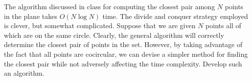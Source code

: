 The algorithm discussed in class for computing the closest pair among
$N$ points in the plane takes $O(N \log  N)$ time.  The divide and
conquer strategy employed is clever, but somewhat complicated.  Suppose
that we are given $N$ points all of which are on the same circle.
Clearly, the general algorithm will correctly determine the closest
pair of points in the set.  However, by taking advantage of the fact
that all points are cocircular, we can devise a simpler method for
finding the closest pair while not adversely affecting the time
complexity.  Develop such an algorithm.
